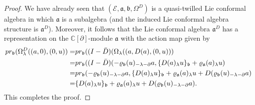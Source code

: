 \documentclass[a4paper,11pt]{article}
\def\Ep{\mathcal{E}}
\def\Vs{\mathfrak{a}}
\def\Ws{\mathfrak{b}}
\def\rep{\varrho}
\def\la{\lambda}
\numberwithin{equation}{section}
\begin{document}
\begin{proof}
We have already seen that  $(\Ep,\Vs,\Ws,\Omega^D)$ is a quasi-twilled Lie conformal algebra in which $\Vs$ is a  subalgebra  (and the induced Lie conformal algebra structure is $\Vs^D$).     Moreover, it follows that
the Lie conformal  algebra $\Vs^D$ has a representation on the $\mathbb{C}[\partial]$-module $\Vs$ with the action map given by
\begin{align*}
pr_{\Ws}(\Omega^D_\la((a,0),(0,u))=& pr_{\Ws}((I-\Bar{D})(\Omega_\la((a,D(a),(0,u))) \\
=& pr_{\Ws}((I-\Bar{D}) 
( - \rep_\Ws(u)_{-\lambda-\partial}a ,
          \{D(a)_\lambda u\}_\Ws + \rep_\Vs(a)_\lambda u )\\
          =&pr_{\Ws}(- \rep_\Ws(u)_{-\lambda-\partial}a, \{D(a)_\lambda u\}_\Ws + \rep_\Vs(a)_\lambda u + D(\rep_\Ws(u)_{-\lambda-\partial}a) \\
 =& \{D(a)_\lambda u\}_\Ws + \rep_\Vs(a)_\lambda u + D(\rep_\Ws(u)_{-\lambda-\partial}a).          
\end{align*}
This completes the proof. 
\end{proof}
\end{document}
